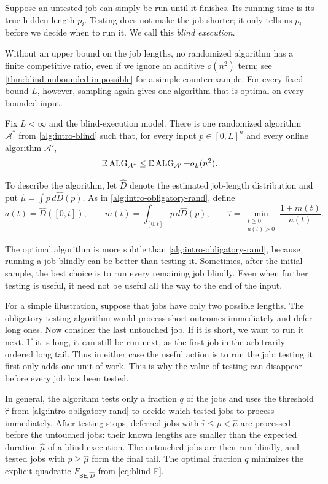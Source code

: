 Suppose an untested job can simply be run until it finishes.  Its running
time is its true hidden length $p_i$.  Testing does not make the job shorter;
it only tells us $p_i$ before we decide when to run it.  We call this
\emph{blind execution}.

Without an upper bound on the job lengths, no randomized algorithm has a
finite competitive ratio, even if we ignore an additive $o(n^2)$ term; see
\cref{thm:blind-unbounded-impossible} for a simple counterexample.  For every
fixed bound $L$, however, sampling again gives one algorithm that is optimal
on every bounded input.


\begin{theorem}
\label{thm:intro-blind-instance}
Fix $L<\infty$ and the blind-execution model.  There is one randomized algorithm $\mathcal A^*$ from \cref{alg:intro-blind} such that,
for every input $p\in[0,L]^n$ and every online algorithm
$\mathcal A'$,
\[
 \mathbb{E}\operatorname{ALG}_{\mathcal A^*}\le \mathbb{E}\operatorname{ALG}_{\mathcal A'}+o_L(n^2).
\]
\end{theorem}

To describe the algorithm, let $\widehat D$ denote the estimated
job-length distribution and put
$\widehat\mu=\int p\,d\widehat D(p)$.  As in
\cref{alg:intro-obligatory-rand}, define
\[
 a(t)=\widehat D([0,t]),\qquad
 m(t)=\int_{[0,t]}p\,d\widehat D(p),
 \qquad
 \widehat\tau
 =\min_{\substack{t\ge0\\a(t)>0}}\frac{1+m(t)}{a(t)}.
\]

The optimal algorithm is more subtle than
\cref{alg:intro-obligatory-rand}, because running a job blindly can be better
than testing it.  Sometimes, after the initial sample, the best choice is to
run every remaining job blindly.  Even when further testing is useful, it
need not be useful all the way to the end of the input.

For a simple illustration, suppose that jobs have only two possible lengths.
The obligatory-testing algorithm would process short outcomes immediately and
defer long ones.  Now consider the last untouched job.  If it is short, we
want to run it next.  If it is long, it can still be run next, as the first
job in the arbitrarily ordered long tail.  Thus in either case the useful
action is to run the job; testing it first only adds one unit of work.  This
is why the value of testing can disappear before every job has been tested.

In general, the algorithm tests only a fraction $q$ of the jobs and uses the
threshold $\widehat\tau$ from \cref{alg:intro-obligatory-rand} to decide
which tested jobs to process immediately.  After testing stops, deferred
jobs with $\widehat\tau\le p<\widehat\mu$ are processed before the untouched
jobs: their known lengths are smaller than the expected duration
$\widehat\mu$ of a blind execution.  The untouched jobs are then run
blindly, and tested jobs with $p\ge\widehat\mu$ form the final tail.  The
optimal fraction $q$ minimizes the explicit quadratic
$F_{\mathsf{BE},\widehat D}$ from \cref{eq:blind-F}.


